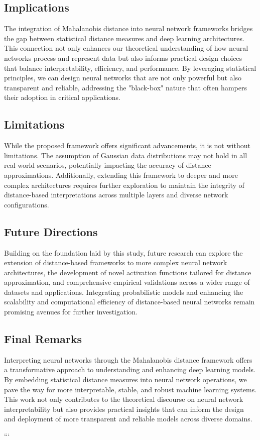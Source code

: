 \subsection{Implications}

The integration of Mahalanobis distance into neural network frameworks bridges the gap between statistical distance measures and deep learning architectures. This connection not only enhances our theoretical understanding of how neural networks process and represent data but also informs practical design choices that balance interpretability, efficiency, and performance. By leveraging statistical principles, we can design neural networks that are not only powerful but also transparent and reliable, addressing the "black-box" nature that often hampers their adoption in critical applications.

\subsection{Limitations}

While the proposed framework offers significant advancements, it is not without limitations. The assumption of Gaussian data distributions may not hold in all real-world scenarios, potentially impacting the accuracy of distance approximations. Additionally, extending this framework to deeper and more complex architectures requires further exploration to maintain the integrity of distance-based interpretations across multiple layers and diverse network configurations.

\subsection{Future Directions}

Building on the foundation laid by this study, future research can explore the extension of distance-based frameworks to more complex neural network architectures, the development of novel activation functions tailored for distance approximation, and comprehensive empirical validations across a wider range of datasets and applications. Integrating probabilistic models and enhancing the scalability and computational efficiency of distance-based neural networks remain promising avenues for further investigation.

\subsection{Final Remarks}

Interpreting neural networks through the Mahalanobis distance framework offers a transformative approach to understanding and enhancing deep learning models. By embedding statistical distance measures into neural network operations, we pave the way for more interpretable, stable, and robust machine learning systems. This work not only contributes to the theoretical discourse on neural network interpretability but also provides practical insights that can inform the design and deployment of more transparent and reliable models across diverse domains.

```